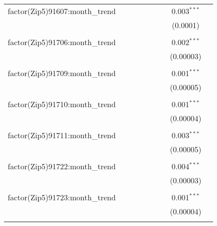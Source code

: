 \begin{table}[H]
{\begin{tabular}{@{\extracolsep{5pt}}lcccccccc}
  factor(Zip5)91607:month\_trend &  &  &  &  &  &  & 0.003$^{***}$ &  \\  

   &  &  &  &  &  &  & (0.0001) &  \\  

   & & & & & & & & \\  

  factor(Zip5)91706:month\_trend &  &  &  &  &  &  & 0.002$^{***}$ &  \\  

   &  &  &  &  &  &  & (0.00003) &  \\  

   & & & & & & & & \\  

  factor(Zip5)91709:month\_trend &  &  &  &  &  &  & 0.001$^{***}$ &  \\  

   &  &  &  &  &  &  & (0.00005) &  \\  

   & & & & & & & & \\  

  factor(Zip5)91710:month\_trend &  &  &  &  &  &  & 0.001$^{***}$ &  \\  

   &  &  &  &  &  &  & (0.00004) &  \\  

   & & & & & & & & \\  

  factor(Zip5)91711:month\_trend &  &  &  &  &  &  & 0.003$^{***}$ &  \\  

   &  &  &  &  &  &  & (0.00005) &  \\  

   & & & & & & & & \\  

  factor(Zip5)91722:month\_trend &  &  &  &  &  &  & 0.004$^{***}$ &  \\  

   &  &  &  &  &  &  & (0.00003) &  \\  

   & & & & & & & & \\  

  factor(Zip5)91723:month\_trend &  &  &  &  &  &  & 0.001$^{***}$ &  \\  

   &  &  &  &  &  &  & (0.00004) &  \\  

   & & & & & & & & \\  


\end{tabular}}
\end{table}
